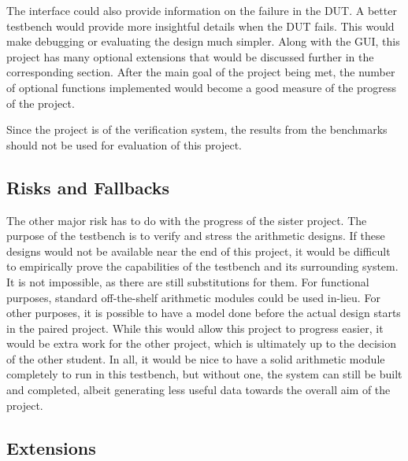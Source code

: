 The interface could also provide information on the failure in the DUT.
A better testbench would provide more insightful details when the DUT fails.
This would make debugging or evaluating the design much simpler.
Along with the GUI, this project has many optional extensions that would be
discussed further in the corresponding section.
After the main goal of the project being met, the number of optional functions
implemented would become a good measure of the progress of the project.

Since the project is of the verification system, the results from the benchmarks
should not be used for evaluation of this project.

\subsection{Risks and Fallbacks}

The other major risk has to do with the progress of the sister project.
The purpose of the testbench is to verify and stress the arithmetic designs.
If these designs would not be available near the end of this project,
it would be difficult to empirically prove the capabilities of the testbench
and its surrounding system.
It is not impossible, as there are still substitutions for them.
For functional purposes, standard off-the-shelf arithmetic modules could be
used in-lieu.
For other purposes, it is possible to have a model done before the actual design
starts in the paired project.
While this would allow this project to progress easier, it would be extra work
for the other project, which is ultimately up to the decision of the other
student.
In all, it would be nice to have a solid arithmetic module completely to run
in this testbench, but without one, the system can still be built and completed,
albeit generating less useful data towards the overall aim of the project.

\subsection{Extensions}
